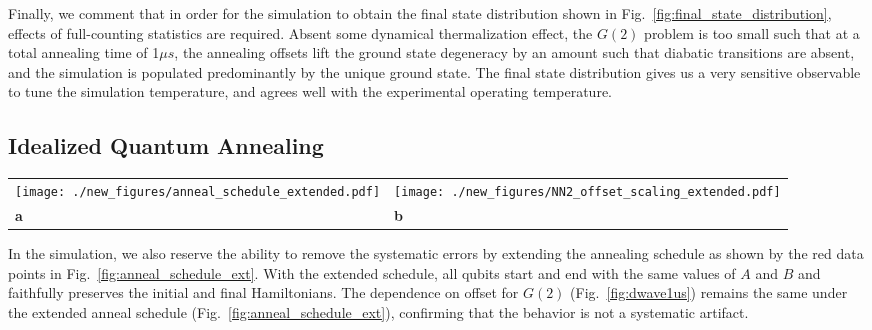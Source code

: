 \documentclass[prd,twocolumn,tightenlines,preprintnumbers,showpacs,superscriptaddress,notitlepage,nofootinbib,eqsecnum,floatfix,longbibliography,aps,10pt]{revtex4-2}
\begin{document}
Finally, we comment that in order for the simulation to obtain the final state distribution shown in Fig.~\ref{fig:final_state_distribution}, effects of full-counting statistics are required.
Absent some dynamical thermalization effect, the $G(2)$ problem is too small such that at a total annealing time of 1$\mu s$, the annealing offsets lift the ground state degeneracy by an amount such that diabatic transitions are absent, and the simulation is populated predominantly by the unique ground state.
The final state distribution gives us a very sensitive observable to tune the simulation temperature, and agrees well with the experimental operating temperature.


\subsection{Idealized Quantum Annealing}
\label{sec:discussion:idealqa}

\begin{figure*}
    \centering
	\begin{tabular}{p{}p{}}
	\texttt{[image: ./new\_figures/anneal\_schedule\_extended.pdf]}
    &
	\texttt{[image: ./new\_figures/NN2\_offset\_scaling\_extended.pdf]}\\
	\centering \textbf{a} & \centering \textbf{b}
	\end{tabular}
	\centering
	\caption{Extended annealing schedule and simulation result. \textbf{a)} The annealing time is increased by 10\% at both the start and end, and the initial values of $A(s)$ and $B(s)$ at non-zero offset are also not extrapolated in comparison to Fig.~\ref{fig:anneal_schedule}. Therefore, the initial and final Hamiltonian are no longer suffer systematic error at non-zero offset. \textbf{b)} The default (dashed yellow) result is one presented in Fig.~\ref{fig:dwave1us}. Results from extended schedules are presented shown with solid lines with full-counting statistics and amplitude damping (red), only full-counting-statistics (blue), and only amplitude damping (green).
    }
	\label{fig:anneal_schedule_ext}
\end{figure*}

In the simulation, we also reserve the ability to remove the systematic errors by extending the annealing schedule as shown by the red data points in Fig.~\ref{fig:anneal_schedule_ext}. With the extended schedule, all qubits start and end with the same values of $A$ and $B$ and faithfully preserves the initial and final Hamiltonians. The dependence on offset for $G(2)$ (Fig.~\ref{fig:dwave1us}) remains the same under the extended anneal schedule (Fig.~\ref{fig:anneal_schedule_ext}), confirming that the behavior is not a systematic artifact.
\end{document}
